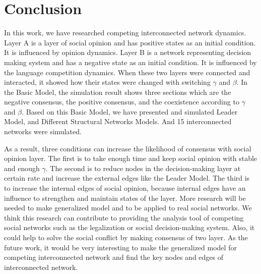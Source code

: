 \documentclass[english]{cccconf}
\begin{document}
\section{Conclusion}
In this work, we have researched competing interconnected network dynamics. Layer A is a layer of social opinion and has positive states as an initial condition. It is influenced by opinion dynamics. Layer B is a network representing decision making system and has a negative state as an initial condition. It is influenced by the language competition dynamics. When these two layers were connected and interacted, it showed how their states were changed with switching $\gamma$ and $\beta$. In the Basic Model, the simulation result shows three sections which are the negative consensus, the positive consensus, and the coexistence according to $\gamma$ and $\beta$. Based on this Basic Model, we have presented and simulated Leader Model, and Different Structural Networks Models. And 15 interconnected networks were simulated.

As a result, three conditions can increase the likelihood of consensus with social opinion layer. The first is to take enough time and keep social opinion with stable and enough $\gamma$. The second is to reduce nodes in the decision-making layer at certain rate and increase the external edges like the Leader Model. The third is to increase the internal edges of social opinion, because internal edges have an influence to strengthen and maintain states of the layer. More research will be needed to make generalized model and to be applied to real social networks. We think this research can contribute to providing the analysis tool of competing social networks such as the legalization or social decision-making system. Also, it could help to solve the social conflict by making consensus of two layer. As the future work, it would be very interesting to make the generalized model for competing interconnected network and find the key nodes and edges of interconnected network.
\end{document}
